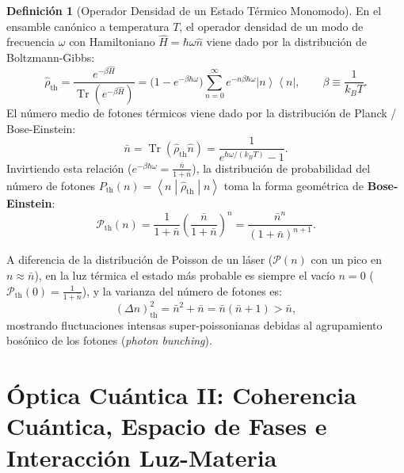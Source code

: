 \documentclass[11pt,a4paper,twoside]{report}
\theoremstyle{definition}
\newtheorem{definicion}{Definición}[chapter]
\theoremstyle{plain}
\theoremstyle{remark}
\newcommand{\ketbra}[2]{\left| #1 \right\rangle\!\left\langle #2 \right|}
\newcommand{\mel}[3]{\left\langle #1 \middle| #2 \middle| #3 \right\rangle}
\newcommand{\tr}{\operatorname{Tr}}
\newcommand{\op}[1]{\hat{#1}}
\begin{document}
\begin{definicion}[Operador Densidad de un Estado Térmico Monomodo]
En el ensamble canónico a temperatura $T$, el operador densidad de un modo de frecuencia $\omega$ con Hamiltoniano $\op{H} = \hbar\omega\op{n}$ viene dado por la distribución de Boltzmann-Gibbs:
\begin{equation}
    \op{\rho}_{\text{th}} = \frac{e^{-\beta\op{H}}}{\tr\left(e^{-\beta\op{H}}\right)} = \big(1 - e^{-\beta\hbar\omega}\big)\sum_{n=0}^{\infty} e^{-n\beta\hbar\omega}\ketbra{n}{n}, \qquad \beta \equiv \frac{1}{k_B T}.
\end{equation}
El número medio de fotones térmicos viene dado por la distribución de Planck / Bose-Einstein:
\begin{equation}
    \bar{n} = \tr(\op{\rho}_{\text{th}}\op{n}) = \frac{1}{e^{\hbar\omega/(k_B T)} - 1}.
\end{equation}
Invirtiendo esta relación ($e^{-\beta\hbar\omega} = \frac{\bar{n}}{1+\bar{n}}$), la distribución de probabilidad del número de fotones $P_{\text{th}}(n) = \mel{n}{\op{\rho}_{\text{th}}}{n}$ toma la forma geométrica de \textbf{Bose-Einstein}:
\begin{equation}
    \mathcal{P}_{\text{th}}(n) = \frac{1}{1 + \bar{n}}\left(\frac{\bar{n}}{1 + \bar{n}}\right)^n = \frac{\bar{n}^n}{(1 + \bar{n})^{n+1}}.
\end{equation}
\end{definicion}

A diferencia de la distribución de Poisson de un láser ($\mathcal{P}(n)$ con un pico en $n \approx \bar{n}$), en la luz térmica el estado más probable es siempre el vacío $n = 0$ ($\mathcal{P}_{\text{th}}(0) = \frac{1}{1+\bar{n}}$), y la varianza del número de fotones es:
\begin{equation}
    (\Delta n)^2_{\text{th}} = \bar{n}^2 + \bar{n} = \bar{n}(\bar{n} + 1) > \bar{n},
\end{equation}
mostrando fluctuaciones intensas super-poissonianas debidas al agrupamiento bosónico de los fotones (\textit{photon bunching}).

\chapter{Óptica Cuántica II: Coherencia Cuántica, Espacio de Fases e Interacción Luz-Materia}
\end{document}
